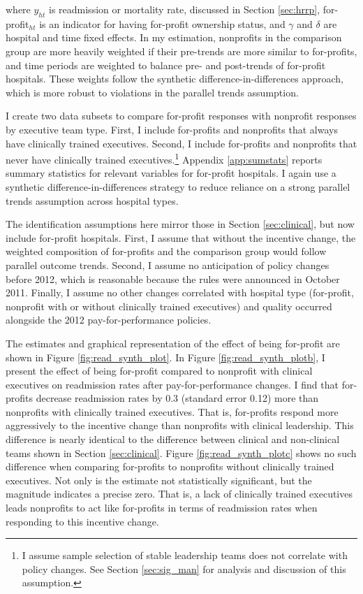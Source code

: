 \documentclass[12pt]{article}
\begin{document}
    \noindent where $y_{ht}$ is readmission or mortality rate, discussed in Section \ref{sec:hrrp}, for-profit$_{ht}$ is an indicator for having for-profit ownership status, and $\gamma$ and $\delta$ are hospital and time fixed effects. In my estimation, nonprofits in the comparison group are more heavily weighted if their pre-trends are more similar to for-profits, and time periods are weighted to balance pre- and post-trends of for-profit hospitals. These weights follow the synthetic difference-in-differences approach, which is more robust to violations in the parallel trends assumption. 
    
    I create two data subsets to compare for-profit responses with nonprofit responses by executive team type. First, I include for-profits and nonprofits that always have clinically trained executives. Second, I include for-profits and nonprofits that never have clinically trained executives.\footnote{I assume sample selection of stable leadership teams does not correlate with policy changes. See Section \ref{sec:sig_man} for analysis and discussion of this assumption.} Appendix \ref{app:sumstats} reports summary statistics for relevant variables for for-profit hospitals. I again use a synthetic difference-in-differences strategy to reduce reliance on a strong parallel trends assumption across hospital types.

    The identification assumptions here mirror those in Section \ref{sec:clinical}, but now include for-profit hospitals. First, I assume that without the incentive change, the weighted composition of for-profits and the comparison group would follow parallel outcome trends. Second, I assume no anticipation of policy changes before 2012, which is reasonable because the rules were announced in October 2011. Finally, I assume no other changes correlated with hospital type (for-profit, nonprofit with or without clinically trained executives) and quality occurred alongside the 2012 pay-for-performance policies.

    The estimates and graphical representation of the effect of being for-profit are shown in Figure \ref{fig:read_synth_plot}. In Figure \ref{fig:read_synth_plotb}, I present the effect of being for-profit compared to nonprofit with clinical executives on readmission rates after pay-for-performance changes. I find that for-profits decrease readmission rates by 0.3 (standard error 0.12) more than nonprofits with clinically trained executives. That is, for-profits respond more aggressively to the incentive change than nonprofits with clinical leadership. This difference is nearly identical to the difference between clinical and non-clinical teams shown in Section \ref{sec:clinical}. Figure \ref{fig:read_synth_plotc} shows no such difference when comparing for-profits to nonprofits without clinically trained executives. Not only is the estimate not statistically significant, but the magnitude indicates a precise zero. That is, a lack of clinically trained executives leads nonprofits to act like for-profits in terms of readmission rates when responding to this incentive change. 
\end{document}
